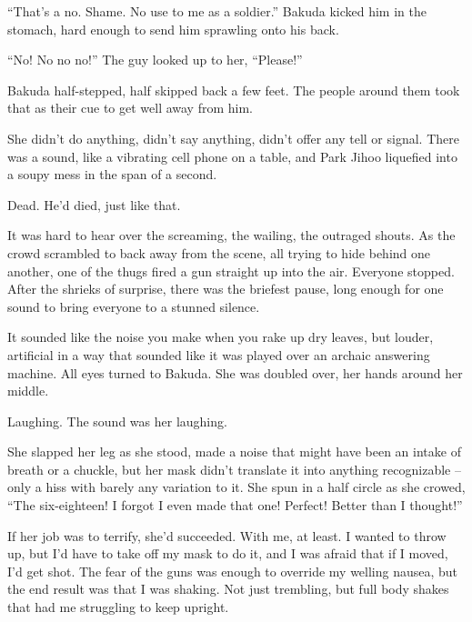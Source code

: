 ``That's a no.  Shame.  No use to me as a soldier.''  Bakuda kicked him in the stomach, hard enough to send him sprawling onto his back.



``No!  No no no!'' The guy looked up to her, ``Please!''



Bakuda half-stepped, half skipped back a few feet.  The people around them took that as their cue to get well away from him.



She didn't do anything, didn't say anything, didn't offer any tell or signal.  There was a sound, like a vibrating cell phone on a table, and Park Jihoo liquefied into a soupy mess in the span of a second.



Dead.  He'd died, just like that.



It was hard to hear over the screaming, the wailing, the outraged shouts.  As the crowd scrambled to back away from the scene, all trying to hide behind one another, one of the thugs fired a gun straight up into the air.  Everyone stopped.  After the shrieks of surprise, there was the briefest pause, long enough for one sound to bring everyone to a stunned silence.



It sounded like the noise you make when you rake up dry leaves, but louder, artificial in a way that sounded like it was played over an archaic answering machine.  All eyes turned to Bakuda.  She was doubled over, her hands around her middle.



Laughing.  The sound was her laughing.



She slapped her leg as she stood, made a noise that might have been an intake of breath or a chuckle, but her mask didn't translate it into anything recognizable – only a hiss with barely any variation to it.  She spun in a half circle as she crowed, ``The six-eighteen!  I forgot I even made that one!  Perfect!  Better than I thought!''



If her job was to terrify, she'd succeeded.  With me, at least.  I wanted to throw up, but I'd have to take off my mask to do it, and I was afraid that if I moved, I'd get shot.  The fear of the guns was enough to override my welling nausea, but the end result was that I was shaking.  Not just trembling, but full body shakes that had me struggling to keep upright.



